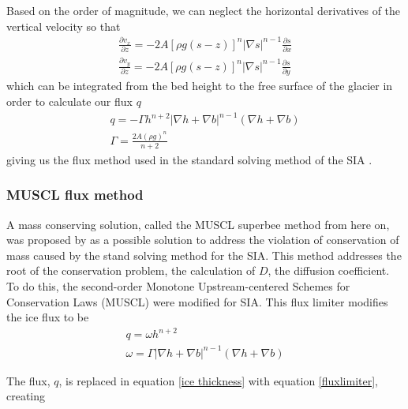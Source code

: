 \documentclass{article}
\begin{document}
Based on the order of magnitude, we can neglect the horizontal derivatives of the vertical velocity so that
\begin{subequations}
\begin{gather}
    \frac{\partial v_x}{\partial z} = -2A[\rho g (s-z)]^n|\nabla s |^{n-1}\frac{\partial s}{\partial x} \\
    \frac{\partial v_y}{\partial z} = -2A[\rho g (s-z)]^n|\nabla s |^{n-1}\frac{\partial s}{\partial y} 
\end{gather}
\end{subequations}
which can be integrated from the bed height to the free surface of the glacier in order to calculate our flux $q$
\begin{subequations}
\begin{gather}\label{q}
    q = -\Gamma  h^{n+2} |\nabla h+\nabla b|^{n-1} (\nabla h + \nabla b)  \\
    \Gamma = \frac{2A (\rho g)^n}{n+2} 
\end{gather}
\end{subequations}
giving us the flux method used in the standard solving method of the SIA \citep{Jarosch2013, Greve2009}.


\subsubsection{MUSCL flux method}
A mass conserving solution, called the MUSCL superbee method from here on, was proposed by \citet{Jarosch2013} as a possible solution to address the violation of conservation of mass caused by the stand solving method for the SIA. This method addresses the root of the conservation problem, the calculation of $D$, the diffusion coefficient. To do this, the second-order Monotone Upstream-centered Schemes for Conservation Laws (MUSCL) were modified for SIA. This flux limiter modifies the ice flux to be 
\begin{subequations}\label{fluxlimiter}
\begin{gather}
q  = \omega h^{n+2}  \\
\omega  = \Gamma | \nabla h + \nabla b |^{n-1}(\nabla h + \nabla b) 
\end{gather}
\end{subequations}

The flux, $q$, is replaced in equation \ref{ice thickness} with equation \ref{fluxlimiter}, creating
\end{document}
